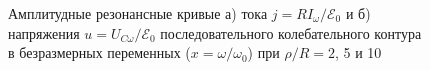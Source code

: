 \begin{figure}[h!]
    \begin{minipage}[h]{0.5\linewidth}
        \centering
    \end{minipage}
    \hfill
    \begin{minipage}[h]{0.5\linewidth}
        \centering
    \end{minipage}
    \caption{Амплитудные резонансные кривые а) тока $j=RI_{\omega}/\mathcal{E}_0$ 
         и б) напряжения $u=U_{C\omega}/\mathcal{E}_0$ 
         последовательного колебательного контура в безразмерных переменных 
         ($x=\omega/\omega_0$) при $\rho/R=2$, 5 и 10}
\end{figure}

